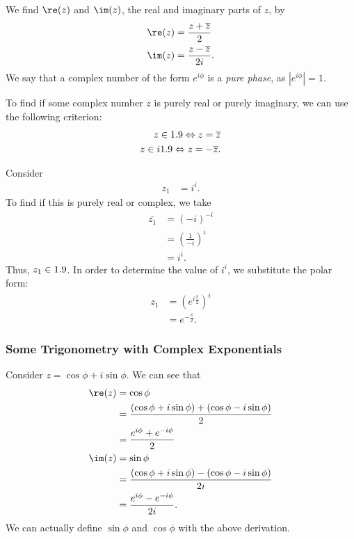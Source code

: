 \documentclass[10pt]{mypackage}
\begin{document}
We find $\re(z)$ and $\im(z)$, the real and imaginary parts of $z$, by
\begin{align*}
  \re(z) &= \frac{z + \overline{z}}{2}\\
  \im(z) &= \frac{z - \overline{z}}{2i}.
\end{align*}
We say that a complex number of the form $e^{i\phi}$ is a \textit{pure phase}, as $\left\vert e^{i\phi} \right\vert = 1$.\newline

To find if some complex number $z$ is purely real or purely imaginary, we can use the following criterion:
\begin{align*}
  z\in 1.9 \Leftrightarrow z = \overline{z}\\
  z\in i1.9 \Leftrightarrow z = -\overline{z}.
\end{align*}
\begin{example}
  Consider
  \begin{align*}
    z_1 &= i^{i}.
  \end{align*}
  To find if this is purely real or complex, we take
  \begin{align*}
    \overline{z_1} &= \left(-i\right)^{-i}\\
               &= \left(\frac{1}{-i}\right)^{i}\\
               &= i^{i}.
  \end{align*}
  Thus, $z_1\in 1.9$. In order to determine the value of $i^i$, we substitute the polar form:
  \begin{align*}
    z_1 &= \left(e^{i\frac{\pi}{2}}\right)^{i}\\
        &= e^{-\frac{\pi}{2}}.
  \end{align*}
\end{example}
\subsubsection{Some Trigonometry with Complex Exponentials}%
Consider $z = \cos \phi + i\sin\phi$. We can see that
\begin{align*}
  \re(z) &= \cos\phi\\
         &= \frac{\left(\cos \phi + i\sin\phi\right) + \left(\cos\phi - i\sin\phi\right)}{2}\\
         &= \frac{e^{i\phi} + e^{-i\phi}}{2}\\
  \im(z) &= \sin\phi\\
         &= \frac{\left(\cos\phi + i\sin\phi\right) - \left(\cos\phi - i\sin\phi\right)}{2i}\\
         &= \frac{e^{i\phi} - e^{-i\phi}}{2i}.
\end{align*}
We can actually define $\sin\phi$ and $\cos\phi$ with the above derivation.\newline
\end{document}
